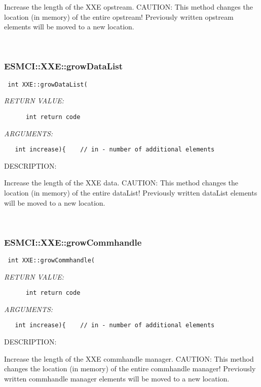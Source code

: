     Increase the length of the XXE opstream.
    CAUTION: This method changes the location (in memory) of the entire opstream!
      Previously written opstream elements will be moved to a new location. 
 
\mbox{}\hrulefill\
 
\subsubsection [ESMCI::XXE::growDataList] {ESMCI::XXE::growDataList}


  
\begin{verbatim} int XXE::growDataList(\end{verbatim}{\em RETURN VALUE:}
\begin{verbatim}      int return code\end{verbatim}{\em ARGUMENTS:}
\begin{verbatim}   int increase){    // in - number of additional elements\end{verbatim}
{\sf DESCRIPTION:\\ }


    Increase the length of the XXE data.
    CAUTION: This method changes the location (in memory) of the entire dataList!
      Previously written dataList elements will be moved to a new location. 
 
\mbox{}\hrulefill\
 
\subsubsection [ESMCI::XXE::growCommhandle] {ESMCI::XXE::growCommhandle}


  
\begin{verbatim} int XXE::growCommhandle(\end{verbatim}{\em RETURN VALUE:}
\begin{verbatim}      int return code\end{verbatim}{\em ARGUMENTS:}
\begin{verbatim}   int increase){    // in - number of additional elements\end{verbatim}
{\sf DESCRIPTION:\\ }


    Increase the length of the XXE commhandle manager.
    CAUTION: This method changes the location (in memory) of the entire
             commhandle manager!
      Previously written commhandle manager elements will be moved to a new
      location. 
 
